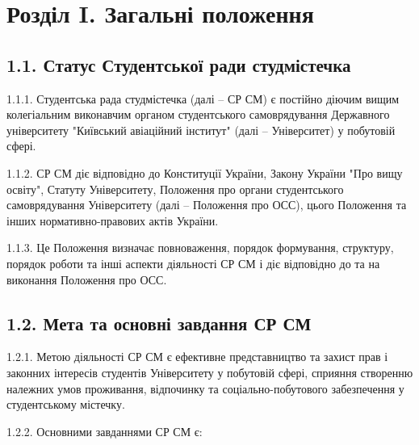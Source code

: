 \section*{Розділ I. Загальні положення}

\subsection*{1.1. Статус Студентської ради студмістечка}
    1.1.1. Студентська рада студмістечка (далі – СР СМ) є постійно діючим вищим колегіальним виконавчим органом студентського самоврядування Державного університету "Київський авіаційний інститут" (далі – Університет) у побутовій сфері.

    1.1.2. СР СМ діє відповідно до Конституції України, Закону України "Про вищу освіту", Статуту Університету, Положення про органи студентського самоврядування Університету (далі – Положення про ОСС), цього Положення та інших нормативно-правових актів України.

    1.1.3. Це Положення визначає повноваження, порядок формування, структуру, порядок роботи та інші аспекти діяльності СР СМ і діє відповідно до та на виконання Положення про ОСС.

\subsection*{1.2. Мета та основні завдання СР СМ}
    1.2.1. Метою діяльності СР СМ є ефективне представництво та захист прав і законних інтересів студентів Університету у побутовій сфері, сприяння створенню належних умов проживання, відпочинку та соціально-побутового забезпечення у студентському містечку.

    1.2.2. Основними завданнями СР СМ є:

